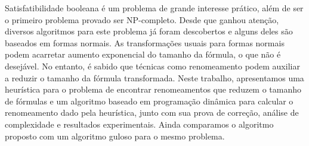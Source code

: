 Satisfatibilidade booleana é um problema de grande interesse prático, além de ser o primeiro problema provado ser NP-completo. Desde que ganhou atenção, diversos algoritmos para este problema já foram descobertos e alguns deles são baseados em formas normais. As transformações usuais para formas normais podem acarretar aumento exponencial do tamanho da fórmula, o que não é desejável. No entanto, é sabido que técnicas como renomeamento podem auxiliar a reduzir o tamanho da fórmula transformada. Neste trabalho, apresentamos uma heurística para o problema de encontrar renomeamentos que reduzem o tamanho de fórmulas e um algoritmo baseado em programação dinâmica para calcular o renomeamento dado pela heurística, junto com sua prova de correção, análise de complexidade e resultados experimentais. Ainda comparamos o algoritmo proposto com um algoritmo guloso para o mesmo problema.